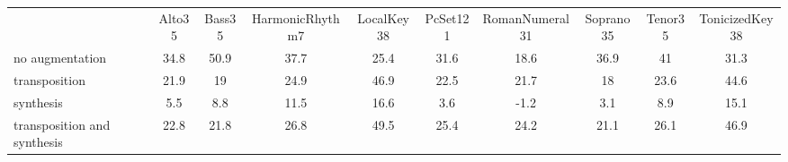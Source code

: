 \begin{tabular}{lccccccccc}
                            & Alto35 & Bass35 & HarmonicRhythm7 & LocalKey38 & PcSet121 & RomanNumeral31 & Soprano35 & Tenor35 & TonicizedKey38 \\
no augmentation             & 34.8   & 50.9   & 37.7            & 25.4       & 31.6     & 18.6           & 36.9      & 41      & 31.3           \\
transposition               & 21.9   & 19     & 24.9            & 46.9       & 22.5     & 21.7           & 18        & 23.6    & 44.6           \\
synthesis                   & 5.5    & 8.8    & 11.5            & 16.6       & 3.6      & -1.2           & 3.1       & 8.9     & 15.1           \\
transposition and synthesis & 22.8   & 21.8   & 26.8            & 49.5       & 25.4     & 24.2           & 21.1      & 26.1    & 46.9          
\end{tabular}
